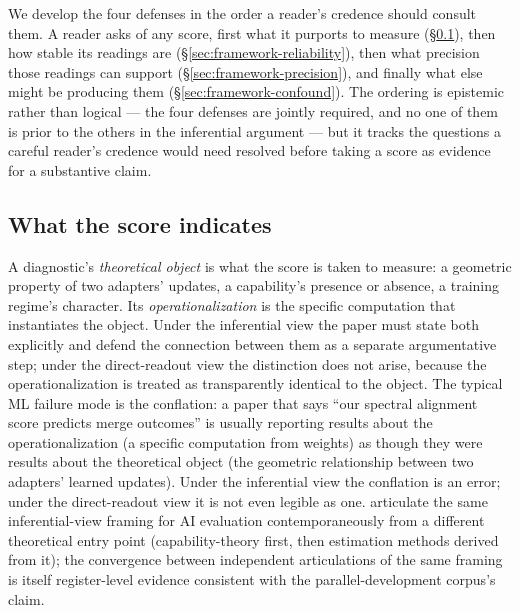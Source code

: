 \documentclass[10pt]{article}
\begin{document}
We develop the four defenses in the order a reader's credence should
consult them. A reader asks of any score, first what it purports to
measure (§\ref{sec:framework-construct}), then how stable its
readings are (§\ref{sec:framework-reliability}), then what precision
those readings can support (§\ref{sec:framework-precision}), and
finally what else might be producing them
(§\ref{sec:framework-confound}). The ordering is epistemic rather
than logical --- the four defenses are jointly required, and no one
of them is prior to the others in the inferential argument --- but
it tracks the questions a careful reader's credence would need
resolved before taking a score as evidence for a substantive claim.

\subsection{What the score indicates}
\label{sec:framework-construct}

A diagnostic's \emph{theoretical object} is what the score is taken
to measure: a geometric property of two adapters' updates, a
capability's presence or absence, a training regime's character. Its
\emph{operationalization} is the specific computation that
instantiates the object. Under the inferential view the paper must
state both explicitly and defend the connection between them as a
separate argumentative step; under the direct-readout view the
distinction does not arise, because the operationalization is
treated as transparently identical to the object. The typical ML
failure mode is the conflation: a paper that says ``our spectral
alignment score predicts merge outcomes'' is usually reporting
results about the operationalization (a specific computation from
weights) as though they were results about the theoretical object
(the geometric relationship between two adapters' learned updates).
Under the inferential view the conflation is an error; under the
direct-readout view it is not even legible as one.
\citet{jo2025evalinference} articulate the same inferential-view
framing for AI evaluation contemporaneously from a different
theoretical entry point (capability-theory first, then estimation
methods derived from it); the convergence between independent
articulations of the same framing is itself register-level
evidence consistent with the parallel-development corpus's claim.
\end{document}
